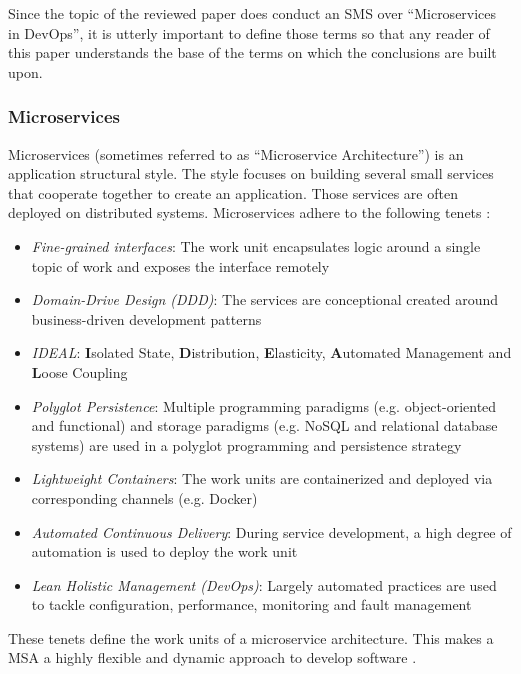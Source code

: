 Since the topic of the reviewed paper does conduct an SMS over ``Microservices in DevOps'',
it is utterly important to define those terms so that any reader of this paper
understands the base of the terms on which the conclusions are built upon.

\subsubsection{Microservices}

Microservices (sometimes referred to as ``Microservice Architecture'') is an application
structural style. The style focuses on building several small services that cooperate
together to create an application. Those services are often deployed on distributed
systems. Microservices adhere to the following tenets \cite{zio:MSATenets}:

\begin{itemize}
    \item \textit{Fine-grained interfaces}: The work unit encapsulates logic
    around a single topic of work and exposes the interface remotely
    \item \textit{Domain-Drive Design (DDD)}: The services are conceptional
    created around business-driven development patterns
    \item \textit{IDEAL}: \textbf{I}solated State, \textbf{D}istribution,
    \textbf{E}lasticity, \textbf{A}utomated Management and \textbf{L}oose Coupling
    \item \textit{Polyglot Persistence}: Multiple programming paradigms (e.g.
    object-oriented and functional) and storage paradigms (e.g. NoSQL and relational
    database systems) are used in a polyglot programming and persistence strategy
    \item \textit{Lightweight Containers}: The work units are containerized and
    deployed via corresponding channels (e.g. Docker)
    \item \textit{Automated Continuous Delivery}: During service development,
    a high degree of automation is used to deploy the work unit
    \item \textit{Lean Holistic Management (DevOps)}: Largely automated practices
    are used to tackle configuration, performance, monitoring and fault management
\end{itemize}

These tenets define the work units of a microservice architecture. This makes
a MSA a highly flexible and dynamic approach to develop software \cite{zio:MSATenets}.

